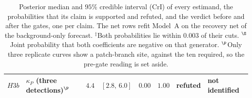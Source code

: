\begin{table}[!tbp]
\begin{tabular}{@{}llrlccll@{}}
        \midrule
        $H3b$ & $\kappa_P$ (three detections)$^{\P}$ & $4.4$ & $[2.8,\,6.0]$ & $0.00$ & $1.00$ & refuted & not identified \\
        \bottomrule
    \end{tabular}
\caption{Posterior median and $95\%$ credible interval (CrI) of every estimand, the probabilities that its claim is supported and refuted, and the verdict before and after the gates, one per claim. The net rows refit Model~A on the recovery net of the background-only forecast. $^{\ddagger}$Both probabilities lie within $0.003$ of their cuts. $^{\S}$Joint probability that both coefficients are negative on that generator. $^{\P}$Only three replicate curves show a patch-branch site, against the ten required, so the pre-gate reading is set aside.}%
    \label{tab:bayesEstimates}
\end{table}
